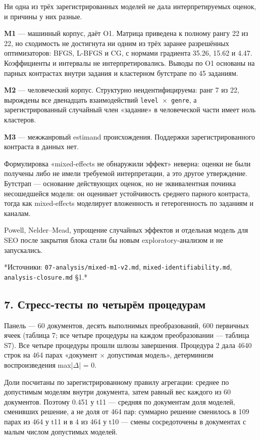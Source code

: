 \documentclass[11pt,a4paper]{article}
\renewcommand{\_}{\textunderscore\allowbreak}
\begin{document}
Ни одна из трёх зарегистрированных моделей не дала интерпретируемых оценок, и
причины у них разные.

\textbf{M1} — машинный корпус, даёт O1. Матрица приведена к полному рангу 22 из 22, но
сходимость не достигнута ни одним из трёх заранее разрешённых оптимизаторов:
BFGS, L-BFGS и CG, с нормами градиента 35.26, 15.62 и 4.47. Коэффициенты и
интервалы не интерпретировались. Выводы по O1 основаны на парных контрастах
внутри задания и кластерном бутстрапе по 45 заданиям.

\textbf{M2} — человеческий корпус. Структурно неидентифицируема: ранг 7 из 22,
вырождены все двенадцать взаимодействий \texttt{level $\times$ genre}, а зарегистрированный
случайный член «задание» в человеческой части имеет ноль кластеров.

\textbf{M3} — межжанровый estimand происхождения. Поддержки зарегистрированного
контраста в данных нет.

Формулировка «mixed-effects не обнаружили эффект» неверна: оценки не были
получены либо не имели требуемой интерпретации, а это другое утверждение.
Бутстрап — основание действующих оценок, но не эквивалентная починка
несошедшейся модели: он оценивает устойчивость среднего парного контраста, тогда
как mixed-effects моделирует вложенность и гетерогенность по заданиям и каналам.

Powell, Nelder–Mead, упрощение случайных эффектов и отдельная модель для SEO
после закрытия блока стали бы новым exploratory-анализом и не запускались.

*Источники: \texttt{07-\allowbreak{}analysis/mixed-\allowbreak{}m1-\allowbreak{}v2.md}, \texttt{mixed-\allowbreak{}identifiability.md},
\texttt{analysis-\allowbreak{}closure.md} §1.*

\subsection{7. Стресс-тесты по четырём процедурам}

Панель — 60 документов, десять выполнимых преобразований, 600 первичных ячеек
(таблица 7; все четыре процедуры на каждом преобразовании — таблица S7).
Все четыре процедуры прошли шлюзы завершения. Процедура 2 дала 4640 строк на 464
парах «документ $\times$ допустимая модель», детерминизм воспроизведения max|$\Delta$| = 0.

\setcounter{table}{6}


Доли посчитаны по зарегистрированному правилу агрегации: среднее по допустимым
моделям внутри документа, затем равный вес каждого из 60 документов. Поэтому
0.451 у t11 — средняя по документам доля моделей, сменивших решение, а не доля
от 464 пар: суммарно решение сменилось в 109 парах из 464 у t11 и в 4 из 464 у
t10 — смены сосредоточены в документах с малым числом допустимых моделей.
\end{document}
